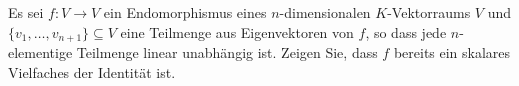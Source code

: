 \begin{question}
  Es sei $f \colon V \to V$ ein Endomorphismus eines $n$-dimensionalen $K$-Vektorraums $V$ und $\{ v_1, \dotsc, v_{n+1} \} \subseteq V$ eine Teilmenge aus Eigenvektoren von $f$, so dass jede $n$-elementige Teilmenge linear unabhängig ist.
  Zeigen Sie, dass $f$ bereits ein skalares Vielfaches der Identität ist.
\end{question}
